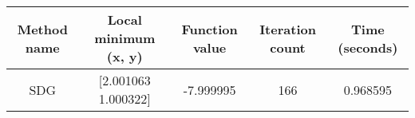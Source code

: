 \begin{tabular}{|c|c|c|c|c|}
    \hline
    Method name & Local minimum (x, y) & Function value & Iteration count & Time (seconds)\\
    \hline
    SDG & [2.001063 1.000322] & -7.999995 & 166 & 0.968595\\
    \hline
\end{tabular}